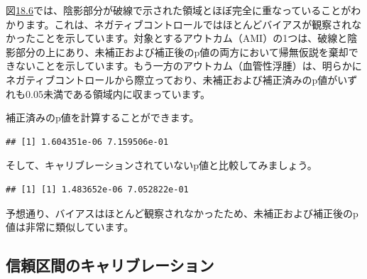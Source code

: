 \documentclass[
  11pt]{book}
\newenvironment{Shaded}{\begin{snugshade}}{\end{snugshade}}
\newcommand{\AttributeTok}[1]{\textcolor[rgb]{0.13,0.29,0.53}{#1}}
\newcommand{\FunctionTok}[1]{\textcolor[rgb]{0.13,0.29,0.53}{\textbf{#1}}}
\newcommand{\NormalTok}[1]{#1}
\newcommand{\OtherTok}[1]{\textcolor[rgb]{0.56,0.35,0.01}{#1}}
\newcommand{\SpecialCharTok}[1]{\textcolor[rgb]{0.81,0.36,0.00}{\textbf{#1}}}
\theoremstyle{definition}
\theoremstyle{definition}
\theoremstyle{definition}
\theoremstyle{definition}
\theoremstyle{remark}
\begin{document}
図\href{https://ohdsi.github.io/TheBookOfOhdsi/MethodValidity.html\#fig:pValueCal}{18.6}では、陰影部分が破線で示された領域とほぼ完全に重なっていることがわかります。これは、ネガティブコントロールではほとんどバイアスが観察されなかったことを示しています。対象とするアウトカム（AMI）の1つは、破線と陰影部分の上にあり、未補正および補正後のp値の両方において帰無仮説を棄却できないことを示しています。もう一方のアウトカム（血管性浮腫）は、明らかにネガティブコントロールから際立っており、未補正および補正済みのp値がいずれも0.05未満である領域内に収まっています。

補正済みのp値を計算することができます。

\begin{Shaded}
\end{Shaded}

\begin{verbatim}
## [1] 1.604351e-06 7.159506e-01
\end{verbatim}

そして、キャリブレーションされていないp値と比較してみましょう。

\begin{Shaded}
\end{Shaded}

\begin{verbatim}
## [1] [1] 1.483652e-06 7.052822e-01
\end{verbatim}

予想通り、バイアスはほとんど観察されなかったため、未補正および補正後のp値は非常に類似しています。

\subsection{信頼区間のキャリブレーション}\label{ux4fe1ux983cux533aux9593ux306eux30adux30e3ux30eaux30d6ux30ecux30fcux30b7ux30e7ux30f3-1}
\end{document}
